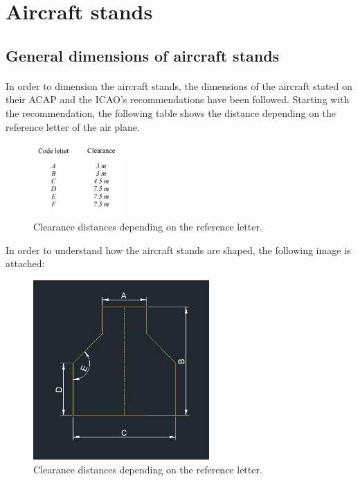 	\section{Aircraft stands}
		\subsection{General dimensions of aircraft stands}
		\paragraph{}In order to dimension the aircraft stands, the dimensions of the aircraft stated on their ACAP and the ICAO's recommendations have been followed. Starting with the recommendation, the following table shows the distance depending on the reference letter of the air plane. 
		
		\begin{figure}[H]
			\centering
			\includegraphics[clip, trim=0cm 0cm 0cm 0cm, width=0.30\textwidth]{./images/Annex14/clearancedistances}
			\caption{Clearance distances depending on the reference letter.} %
			\label{} %
		\end{figure}
		
		In order to understand how the aircraft stands are shaped, the following image is attached:
		
		\begin{figure}[H]
			\centering
			\includegraphics[clip, trim=0cm 0cm 0cm 0cm, width=0.6\textwidth]{./images/Annex14/aircraftstand}
			\caption{Clearance distances depending on the reference letter.} %
			\label{} %
		\end{figure}
		

